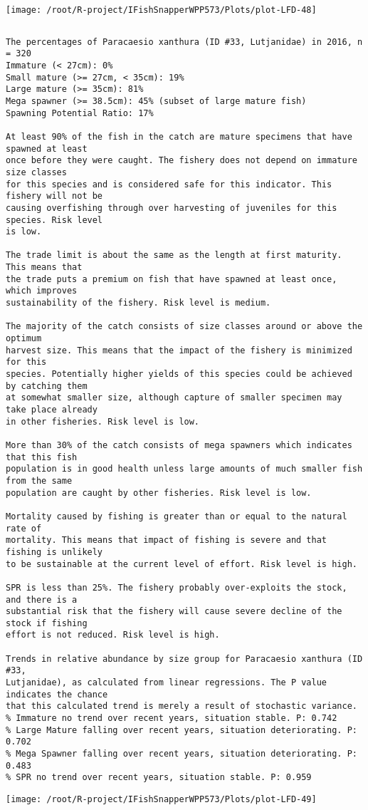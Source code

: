 \documentclass{report}\usepackage[]{graphicx}\usepackage[]{color}
\makeatletter
\def\maxwidth{ %
  \ifdim\Gin@nat@width>\linewidth
    \linewidth
  \else
    \Gin@nat@width
  \fi
}
\newenvironment{kframe}{%
 \def\at@end@of@kframe{}%
 \ifinner\ifhmode%
  \def\at@end@of@kframe{\end{minipage}}%
  \begin{minipage}{\columnwidth}%
 \fi\fi%
 \def\FrameCommand##1{\hskip\@totalleftmargin \hskip-\fboxsep
 \colorbox{shadecolor}{##1}\hskip-\fboxsep
     \hskip-\linewidth \hskip-\@totalleftmargin \hskip\columnwidth}%
 \MakeFramed {\advance\hsize-\width
   \@totalleftmargin\z@ \linewidth\hsize
   \@setminipage}}%
 {\par\unskip\endMakeFramed%
 \at@end@of@kframe}
\newenvironment{knitrout}{}{} %
\makeatother
\begin{document}
\begin{knitrout}
\texttt{[image: /root/R-project/IFishSnapperWPP573/Plots/plot-LFD-48]} 
\begin{kframe}\begin{verbatim}
\end{verbatim}
\end{kframe}
\clearpage
\newpage
\begin{kframe}\begin{verbatim}The percentages of Paracaesio xanthura (ID #33, Lutjanidae) in 2016, n = 320
Immature (< 27cm): 0%
Small mature (>= 27cm, < 35cm): 19%
Large mature (>= 35cm): 81%
Mega spawner (>= 38.5cm): 45% (subset of large mature fish)
Spawning Potential Ratio: 17%
 
At least 90% of the fish in the catch are mature specimens that have spawned at least
once before they were caught. The fishery does not depend on immature size classes
for this species and is considered safe for this indicator. This fishery will not be
causing overfishing through over harvesting of juveniles for this species. Risk level
is low.

The trade limit is about the same as the length at first maturity.  This means that
the trade puts a premium on fish that have spawned at least once, which improves
sustainability of the fishery. Risk level is medium.

The majority of the catch consists of size classes around or above the optimum
harvest size. This means that the impact of the fishery is minimized for this
species. Potentially higher yields of this species could be achieved by catching them
at somewhat smaller size, although capture of smaller specimen may take place already
in other fisheries. Risk level is low.

More than 30% of the catch consists of mega spawners which indicates that this fish
population is in good health unless large amounts of much smaller fish from the same
population are caught by other fisheries. Risk level is low.
 
Mortality caused by fishing is greater than or equal to the natural rate of
mortality. This means that impact of fishing is severe and that fishing is unlikely
to be sustainable at the current level of effort. Risk level is high.
 
SPR is less than 25%. The fishery probably over-exploits the stock, and there is a
substantial risk that the fishery will cause severe decline of the stock if fishing
effort is not reduced. Risk level is high.
 
Trends in relative abundance by size group for Paracaesio xanthura (ID #33,
Lutjanidae), as calculated from linear regressions. The P value indicates the chance
that this calculated trend is merely a result of stochastic variance.
% Immature no trend over recent years, situation stable. P: 0.742
% Large Mature falling over recent years, situation deteriorating. P: 0.702
% Mega Spawner falling over recent years, situation deteriorating. P: 0.483
% SPR no trend over recent years, situation stable. P: 0.959
\end{verbatim}
\end{kframe}
\texttt{[image: /root/R-project/IFishSnapperWPP573/Plots/plot-LFD-49]} 


\end{knitrout}
\end{document}

